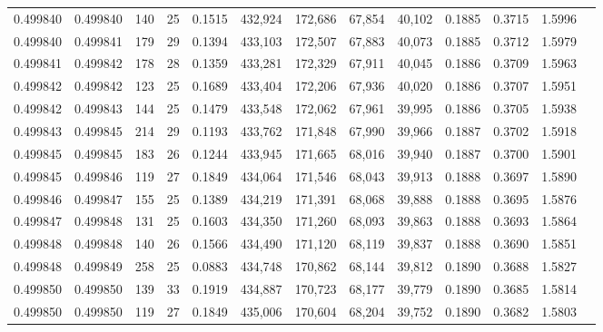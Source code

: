 \begin{tabular}{rrrrrrrrrrrrr}
0.499840 & 0.499840 & 140 &  25 &                                     0.1515 & 432,924 & 172,686 &  67,854 &  40,102 & 0.1885 & 0.3715 & 1.5996 \\
0.499840 & 0.499841 & 179 &  29 &                                     0.1394 & 433,103 & 172,507 &  67,883 &  40,073 & 0.1885 & 0.3712 & 1.5979 \\
0.499841 & 0.499842 & 178 &  28 &                                     0.1359 & 433,281 & 172,329 &  67,911 &  40,045 & 0.1886 & 0.3709 & 1.5963 \\
0.499842 & 0.499842 & 123 &  25 &                                     0.1689 & 433,404 & 172,206 &  67,936 &  40,020 & 0.1886 & 0.3707 & 1.5951 \\
0.499842 & 0.499843 & 144 &  25 &                                     0.1479 & 433,548 & 172,062 &  67,961 &  39,995 & 0.1886 & 0.3705 & 1.5938 \\
0.499843 & 0.499845 & 214 &  29 &                                     0.1193 & 433,762 & 171,848 &  67,990 &  39,966 & 0.1887 & 0.3702 & 1.5918 \\
0.499845 & 0.499845 & 183 &  26 &                                     0.1244 & 433,945 & 171,665 &  68,016 &  39,940 & 0.1887 & 0.3700 & 1.5901 \\
0.499845 & 0.499846 & 119 &  27 &                                     0.1849 & 434,064 & 171,546 &  68,043 &  39,913 & 0.1888 & 0.3697 & 1.5890 \\
0.499846 & 0.499847 & 155 &  25 &                                     0.1389 & 434,219 & 171,391 &  68,068 &  39,888 & 0.1888 & 0.3695 & 1.5876 \\
0.499847 & 0.499848 & 131 &  25 &                                     0.1603 & 434,350 & 171,260 &  68,093 &  39,863 & 0.1888 & 0.3693 & 1.5864 \\
0.499848 & 0.499848 & 140 &  26 &                                     0.1566 & 434,490 & 171,120 &  68,119 &  39,837 & 0.1888 & 0.3690 & 1.5851 \\
0.499848 & 0.499849 & 258 &  25 &                                     0.0883 & 434,748 & 170,862 &  68,144 &  39,812 & 0.1890 & 0.3688 & 1.5827 \\
0.499850 & 0.499850 & 139 &  33 &                                     0.1919 & 434,887 & 170,723 &  68,177 &  39,779 & 0.1890 & 0.3685 & 1.5814 \\
0.499850 & 0.499850 & 119 &  27 &                                     0.1849 & 435,006 & 170,604 &  68,204 &  39,752 & 0.1890 & 0.3682 & 1.5803 \\

\end{tabular}
